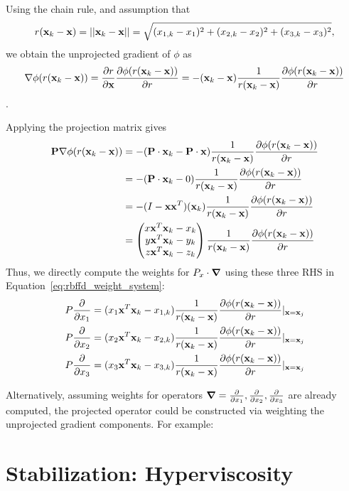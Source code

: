 \documentclass[11pt]{report}
\begin{document}
{Using the chain rule, and assumption that 
$$r(\mathbf{x}_k-\mathbf{x})=\left|\left|\mathbf{x}_k-\mathbf{x}\right|\right| = \sqrt{(x_{1,k}-x_1)^2 + (x_{2,k}-x_2)^2 + (x_{3,k}-x_3)^2},$$
 we obtain the unprojected gradient of $\phi$ as
$$\nabla \phi(r(\mathbf{x}_k - \mathbf{x})) = \frac{\partial r}{\partial \mathbf{x}} \frac{\partial \phi(r(\mathbf{x}_k - \mathbf{x}))}{\partial r} = - (\mathbf{x}_k - \mathbf{x})\frac{1}{r(\mathbf{x}_k - \mathbf{x})} \frac{\partial \phi(r(\mathbf{x}_k - \mathbf{x}))}{\partial r}$$. 

Applying the projection matrix gives 
\begin{align*}
\mathbf{P} \nabla \phi(r(\mathbf{x}_k - \mathbf{x})) & = - (\mathbf{P} \cdot \mathbf{x}_k - \mathbf{P}\cdot\mathbf{x})\frac{1}{r(\mathbf{x}_k - \mathbf{x})} \frac{\partial \phi(r(\mathbf{x}_k - \mathbf{x}))}{\partial r} \\
& =  - (\mathbf{P}\cdot\mathbf{x}_k - 0)\frac{1}{r(\mathbf{x}_k - \mathbf{x})} \frac{\partial \phi(r(\mathbf{x}_k - \mathbf{x}))}{\partial r} \\
& = - (I-\mathbf{x}\mathbf{x}^T)(\mathbf{x}_k
)\frac{1}{r(\mathbf{x}_k - \mathbf{x})} \frac{\partial \phi(r(\mathbf{x}_k - \mathbf{x}))}{\partial r} \\
& = \begin{pmatrix} x \mathbf{x}^T \mathbf{x}_k - x_k \\ y \mathbf{x}^T \mathbf{x}_k -  y_k \\ z \mathbf{x}^T \mathbf{x}_k -z_k \end{pmatrix} \frac{1}{r(\mathbf{x}_k - \mathbf{x})} \frac{\partial \phi(r(\mathbf{x}_k - \mathbf{x}))}{\partial r} 
 \end{align*}
Thus, we directly compute the weights for $P_{x}\cdot\mbox{\boldmath$ \nabla $}$ using these three RHS in Equation~\ref{eq:rbffd_weight_system}: 
\begin{align} 
P\frac{\partial }{\partial x_1} = ( x_1 \mathbf{x}^T \mathbf{x}_k - x_{1,k}) \frac{1}{r(\mathbf{x}_k - \mathbf{x})} \frac{\partial \phi(r(\mathbf{x}_k - \mathbf{x}))}{\partial r} |_{\mathbf{x}=\mathbf{x}_j} \\
P\frac{\partial }{\partial x_2} = ( x_2 \mathbf{x}^T \mathbf{x}_k - x_{2,k}) \frac{1}{r(\mathbf{x}_k - \mathbf{x})} \frac{\partial \phi(r(\mathbf{x}_k - \mathbf{x}))}{\partial r} |_{\mathbf{x}=\mathbf{x}_j} \\
P\frac{\partial }{\partial x_3} = ( x_3 \mathbf{x}^T \mathbf{x}_k - x_{3,k}) \frac{1}{r(\mathbf{x}_k - \mathbf{x})} \frac{\partial \phi(r(\mathbf{x}_k - \mathbf{x}))}{\partial r} |_{\mathbf{x}=\mathbf{x}_j}
\end{align}

Alternatively, assuming weights for operators $\mbox{\boldmath$ \nabla $} = \frac{\partial }{\partial x_{1}}, \frac{\partial }{\partial x_{2}}, \frac{\partial }{\partial x_{3}}$ are already computed, the projected operator could be constructed via weighting the unprojected gradient components. For example: 



\section{Stabilization: Hyperviscosity}

}
\end{document}
